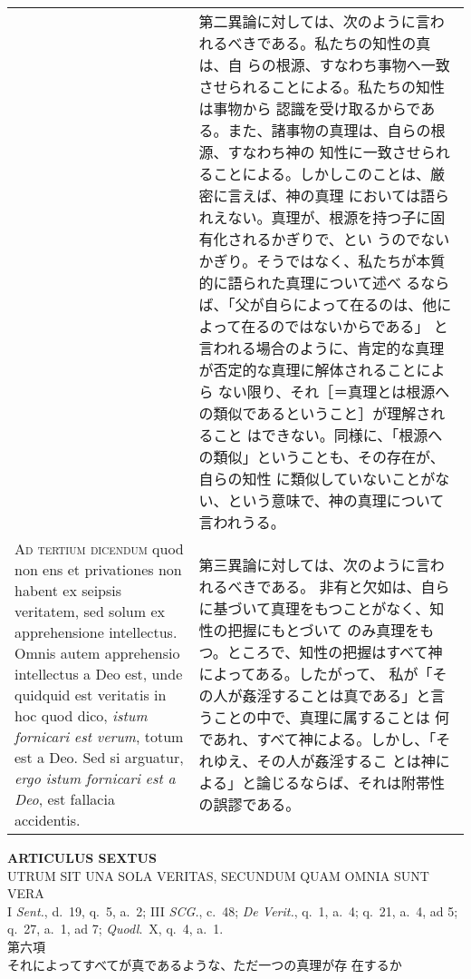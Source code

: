 \documentclass[10pt]{jsarticle} %
\begin{document}
\begin{longtable}{p{21em}p{21em}}
&

第二異論に対しては、次のように言われるべきである。私たちの知性の真は、自
らの根源、すなわち事物へ一致させられることによる。私たちの知性は事物から
認識を受け取るからである。また、諸事物の真理は、自らの根源、すなわち神の
知性に一致させられることによる。しかしこのことは、厳密に言えば、神の真理
においては語られえない。真理が、根源を持つ子に固有化されるかぎりで、とい
うのでないかぎり。そうではなく、私たちが本質的に語られた真理について述べ
るならば、「父が自らによって在るのは、他によって在るのではないからである」
と言われる場合のように、肯定的な真理が否定的な真理に解体されることによら
ない限り、それ［＝真理とは根源への類似であるということ］が理解されること
はできない。同様に、「根源への類似」ということも、その存在が、自らの知性
に類似していないことがない、という意味で、神の真理について言われうる。

\\


{\scshape Ad tertium dicendum} quod non ens et privationes non habent ex seipsis
 veritatem, sed solum ex apprehensione intellectus. Omnis autem
 apprehensio intellectus a Deo est, unde quidquid est veritatis in hoc
 quod dico, {\itshape istum fornicari est verum}, totum est a Deo. Sed
 si arguatur, {\itshape ergo istum fornicari est a Deo}, est fallacia
 accidentis.


&

第三異論に対しては、次のように言われるべきである。
非有と欠如は、自らに基づいて真理をもつことがなく、知性の把握にもとづいて
 のみ真理をもつ。ところで、知性の把握はすべて神によってある。したがって、
私が「その人が姦淫することは真である」と言うことの中で、真理に属することは
 何であれ、すべて神による。しかし、「それゆえ、その人が姦淫するこ
 とは神による」と論じるならば、それは附帯性の誤謬である。




\end{longtable}
\newpage




\begin{center}
 {\Large {\bf ARTICULUS SEXTUS}}\\
 {\large UTRUM SIT UNA SOLA VERITAS, SECUNDUM QUAM OMNIA SUNT VERA}\\
 {\footnotesize I {\itshape Sent.}, d.~19, q.~5, a.~2; III {\itshape
 SCG.}, c.~48; {\itshape De Verit.}, q.~1, a.~4; q.~21, a.~4, ad 5;
 q.~27, a.~1, ad 7; {\itshape Quodl}.~X, q.~4, a.~1.}\\
 {\Large 第六項\\それによってすべてが真であるような、ただ一つの真理が存
 在するか}
\end{center}
\end{document}
